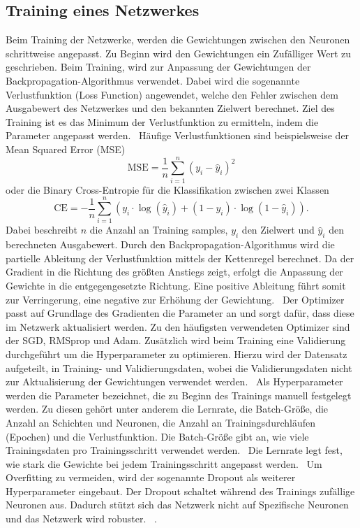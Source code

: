 \subsection{Training eines Netzwerkes}
Beim Training der Netzwerke, werden die Gewichtungen zwischen den Neuronen schrittweise angepasst. 
Zu Beginn wird den Gewichtungen ein Zufälliger Wert zu geschrieben.
Beim Training, wird zur Anpassung der Gewichtungen der Backpropagation-Algorithmus verwendet.
Dabei wird die sogenannte Verlustfunktion (Loss Function) angewendet, welche den Fehler zwischen dem Ausgabewert des Netzwerkes und den bekannten Zielwert berechnet.
Ziel des Training ist es das Minimum der Verlustfunktion zu ermitteln, indem die Parameter angepasst werden.~\cite{datascience}
Häufige Verlustfunktionen sind beispielsweise der Mean Squared Error (MSE)
\begin{equation}
  \text{MSE}  =  \frac{1}{n} \sum_{i=1}^{n} (y_i - \hat{y}_i)^2
\end{equation}
oder die Binary Cross-Entropie für die Klassifikation zwischen zwei Klassen  
\begin{equation}
\text{CE} = -\frac{1}{n} \sum_{i=1}^{n} \left( y_i \cdot \log(\hat{y}_i) + (1 - y_i) \cdot \log(1 - \hat{y}_i) \right).
\label{eq:BCE}
\end{equation}
Dabei beschreibt $n$ die Anzahl an Training samples, $y_i$ den Zielwert und $\hat{y}_i$ den berechneten Ausgabewert.
Durch den Backpropagation-Algorithmus wird die partielle Ableitung der Verlustfunktion mittels der Kettenregel berechnet.
Da der Gradient in die Richtung des größten Anstiegs zeigt, erfolgt die Anpassung der Gewichte in die entgegengesetzte Richtung. 
Eine positive Ableitung führt somit zur Verringerung, eine negative zur Erhöhung der Gewichtung.~\cite{neuralnet}
Der Optimizer passt auf Grundlage des Gradienten die Parameter an und sorgt dafür, dass diese im Netzwerk aktualisiert werden.
Zu den häufigsten verwendeten Optimizer sind der SGD, RMSprop und Adam.
Zusätzlich wird beim Training eine Validierung durchgeführt um die Hyperparameter zu optimieren. 
Hierzu wird der Datensatz aufgeteilt, in Training- und Validierungsdaten, wobei die Validierungsdaten nicht zur Aktualisierung 
der Gewichtungen verwendet werden.~\cite{Yamashita2018}
Als Hyperparameter werden die Parameter bezeichnet, die zu Beginn des Trainings manuell festgelegt werden.
Zu diesen gehört unter anderem die Lernrate, die Batch-Größe, die Anzahl an Schichten und Neuronen, die Anzahl an Trainingsdurchläufen (Epochen)
und die Verlustfunktion.
Die Batch-Größe gibt an, wie viele Trainingsdaten pro Trainingsschritt verwendet werden.~\cite{datascience} 
Die Lernrate legt fest, wie stark die Gewichte bei jedem Trainingsschritt angepasst werden.~\cite{Mohammed2024} 
Um Overfitting zu vermeiden, wird der sogenannte Dropout als weiterer Hyperparameter eingebaut.
Der Dropout schaltet während des Trainings zufällige Neuronen aus.
Dadurch stützt sich das Netzwerk nicht auf Spezifische Neuronen und das Netzwerk wird robuster. ~\cite{Yamashita2018}.

